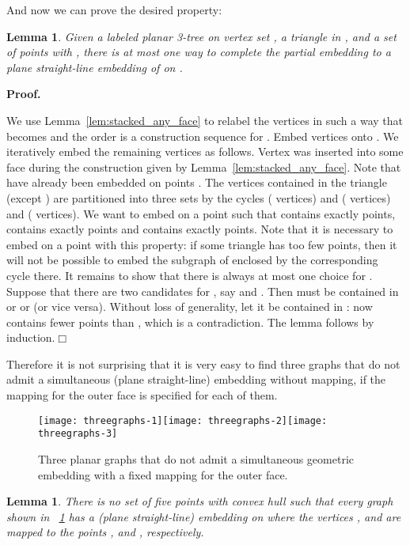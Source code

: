 \documentclass[11pt]{article}
\newtheorem{lemma}[equation]{Lemma}
\newcommand{\qed}{\hfill\ensuremath{\Box}}
\newenvironment{proof}{\noindent\textbf{Proof.}
}{\par\medskip}
\newcommand{\figscale}{1.1}
\begin{document}
And now we can prove the desired property:
\begin{lemma}
  \label{lem:stacked_unique}
  Given a labeled planar 3-tree  on vertex set , a triangle
   in , and a set  of  points with
  , there is at most one way to complete the partial
  embedding  to a plane
  straight-line embedding of  on .
\end{lemma}
\begin{proof}
  We use Lemma~\ref{lem:stacked_any_face} to relabel the vertices in such a way
  that  becomes  and the order  is a construction
  sequence for . Embed vertices  onto . We iteratively
  embed the remaining vertices as follows. Vertex  was inserted into some
  face  during the construction given by
  Lemma~\ref{lem:stacked_any_face}. Note that  have already been
  embedded on points . The vertices contained in the triangle
   (except ) are partitioned into three sets by the cycles 
  ( vertices) and  ( vertices) and  (
  vertices). We want to embed  on a point  such that 
  contains exactly  points,  contains exactly  points
  and  contains exactly  points. Note that it is necessary
  to embed  on a point with this property: if some triangle has too few
  points, then it will not be possible to embed the subgraph of  enclosed by
  the corresponding cycle there. It remains to show that there is always at most
  one choice for . Suppose that there are two candidates for , say
   and . Then  must be contained in  or
   or  (or vice versa). Without loss of
  generality, let it be contained in : now  contains
  fewer points than , which is a contradiction. The lemma follows by
  induction.\qed
\end{proof}
Therefore it is not surprising that it is very easy to find three graphs that do
not admit a simultaneous (plane straight-line) embedding without mapping, if the
mapping for the outer face is specified for each of them.
\begin{figure}[htbp]
  \hfil \texttt{[image: threegraphs-1]}\hfil \texttt{[image: threegraphs-2]}\hfil \texttt{[image: threegraphs-3]}\hfil \caption{\label{fig:three}Three planar graphs that do not admit a simultaneous
    geometric embedding with a fixed mapping for the outer face.}
\end{figure}
\begin{lemma}\label{prop:three}
  There is no set  of five points with convex hull 
  such that every graph shown in \figurename~\ref{fig:three} has a (plane
  straight-line) embedding on  where the vertices ,  and  are mapped
  to the points ,  and , respectively.
\end{lemma}
\end{document}
